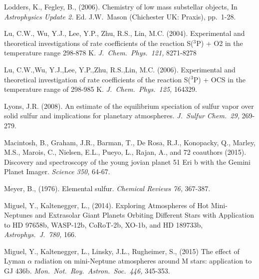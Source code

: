 \documentclass[preprint]{aastex}
\newcounter{reaction}
\begin{document}
\begin{thebibliography}{00}

Lodders, K., Fegley, B., (2006).  Chemistry of low mass substellar
objects,
In {\em Astrophysics Update 2.} Ed. J.W.\ Mason (Chichester UK: Praxis), pp.\ 1-28.

Lu, C.W., Wu, Y.J., Lee, Y.P., Zhu, R.S., Lin, M.C. (2004). Experimental and theoretical investigations of rate coefficients of the reaction S($^3$P) + O2 in the temperature range 298-878 K.  {\em J.\ Chem.\ Phys.\ 121,} 8271-8278

Lu, C.W.,Wu, Y.J.,Lee, Y.P.,Zhu, R.S.,Lin, M.C. (2006).  Experimental and theoretical investigation of rate coefficients of the reaction S($^3$P) + OCS in the temperature range of 298-985 K.  {\em J.\ Chem.\ Phys.\ 125,} 164329.

Lyons, J.R. (2008). 
An estimate of the equilibrium speciation of sulfur vapor over solid sulfur and implications for planetary atmospheres.
{\em J.\ Sulfur Chem.\ 29,} 269-279.

Macintosh, B., Graham, J.R., Barman, T., De Rosa, R.J., Konopacky, Q., Marley, M.S., Marois, C., Nielsen, E.L., Pueyo, L., Rajan, A., and 72 coauthors (2015).  Discovery and spectroscopy of the young jovian planet 51 Eri b with the Gemini Planet Imager. {\em Science 350,} 64-67.

 
 Meyer, B., (1976). Elemental sulfur.
 {\em Chemical Reviews 76,} 367-387.

Miguel, Y., Kaltenegger, L., (2014).
Exploring Atmospheres of Hot Mini-Neptunes and Extrasolar Giant Planets Orbiting Different Stars with Application to HD 97658b, WASP-12b, CoRoT-2b, XO-1b, and HD 189733b,
{\em Astrophys.\ J.\  780,} 166. 

Miguel, Y., Kaltenegger, L., Linsky, J.L., Rugheimer, S., (2015)
The effect of Lyman $\alpha$ radiation on mini-Neptune atmospheres around M stars: application to GJ 436b.
{\em Mon.\ Not.\ Roy.\ Astron.\ Soc.\  446,} 345-353. 


\end{thebibliography}
\end{document}
